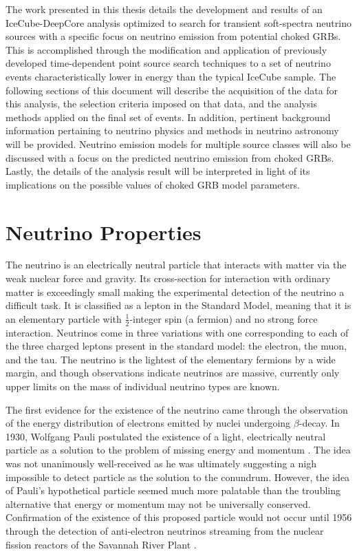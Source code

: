 \documentclass{gatech-thesis}
\begin{document}
The work presented in this thesis details the development and results of an IceCube-DeepCore analysis optimized to search for transient soft-spectra neutrino sources with a specific focus on neutrino emission from potential choked GRBs. This is accomplished through the modification and application of previously developed time-dependent point source search techniques to a set of neutrino events characteristically lower in energy than the typical IceCube sample. The following sections of this document will describe the acquisition of the data for this analysis, the selection criteria imposed on that data, and the analysis methods applied on the final set of events. In addition, pertinent background information pertaining to neutrino physics and methods in neutrino astronomy will be provided. Neutrino emission models for multiple source classes will also be discussed with a focus on the predicted neutrino emission from choked GRBs. Lastly, the details of the analysis result will be interpreted in light of its implications on the possible values of choked GRB model parameters.

\chapter{Neutrino Properties}
The neutrino is an electrically neutral particle that interacts with matter via the weak nuclear force and gravity. Its cross-section for interaction with ordinary matter is exceedingly small making the experimental detection of the neutrino a difficult task. It is classified as a lepton in the Standard Model, meaning that it is an elementary particle with $\frac{1}{2}$-integer spin (a fermion) and no strong force interaction. Neutrinos come in three variations with one corresponding to each of the three charged leptons present in the standard model: the electron, the muon, and the tau. The neutrino is the lightest of the  elementary fermions by a wide margin, and though observations indicate neutrinos are massive, currently only upper limits on the mass of individual neutrino types are known.

The first evidence for the existence of the neutrino came through the observation of the energy distribution of electrons emitted by nuclei undergoing $\beta$-decay. In 1930, Wolfgang Pauli postulated the existence of a light, electrically neutral particle as a solution to the problem of missing energy and momentum \cite{PauliLetter}. The idea was not unanimously well-received as he was ultimately suggesting a nigh impossible to detect particle as the solution to the conundrum. However, the idea of Pauli's hypothetical particle seemed much more palatable than the troubling alternative that energy or momentum may not be universally conserved. Confirmation of the existence of this proposed particle would not occur until 1956 through the detection of anti-electron neutrinos streaming from the nuclear fission reactors of the Savannah River Plant \cite{1956Sci...124..103C}.
\end{document}
